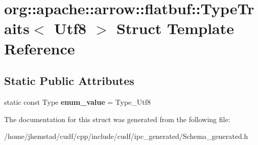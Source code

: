 \hypertarget{structorg_1_1apache_1_1arrow_1_1flatbuf_1_1TypeTraits_3_01Utf8_01_4}{}\section{org\+:\+:apache\+:\+:arrow\+:\+:flatbuf\+:\+:Type\+Traits$<$ Utf8 $>$ Struct Template Reference}
\label{structorg_1_1apache_1_1arrow_1_1flatbuf_1_1TypeTraits_3_01Utf8_01_4}
\subsection*{Static Public Attributes}
\begin{DoxyCompactItemize}
\item 
static const Type {\bfseries enum\+\_\+value} = Type\+\_\+\+Utf8\hypertarget{structorg_1_1apache_1_1arrow_1_1flatbuf_1_1TypeTraits_3_01Utf8_01_4_aaa278c8da431260bc237fa8e8081fff7}{}\label{structorg_1_1apache_1_1arrow_1_1flatbuf_1_1TypeTraits_3_01Utf8_01_4_aaa278c8da431260bc237fa8e8081fff7}

\end{DoxyCompactItemize}


The documentation for this struct was generated from the following file\+:\begin{DoxyCompactItemize}
\item 
/home/jhemstad/cudf/cpp/include/cudf/ipc\+\_\+generated/Schema\+\_\+generated.\+h\end{DoxyCompactItemize}
